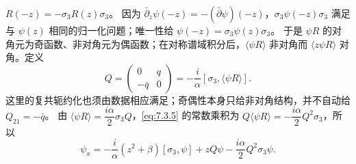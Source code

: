 \documentclass[lang=cn,scheme=chinese,mode=simple,device=normal,color=blue,math=cm,thmcnt=section,12pt]{elegantbook}
\newcommand{\eqq}[2]{\tag{#1}\label{eq:#1}#2}
\begin{document}
$R(-z)=-\sigma_3R(z)\sigma_3$。
因为 $\bar\partial_z\psi(-z)=-(\bar\partial\psi)(-z)$，$\sigma_3\psi(-z)\sigma_3$ 满足与 $\psi(z)$ 相同的归一化问题；唯一性给
$\psi(-z)=\sigma_3\psi(z)\sigma_3$。
于是 $\psi R$ 的对角元为奇函数、非对角元为偶函数；在对称谱域积分后，$\langle\psi R\rangle$ 非对角而 $\langle z\psi R\rangle$ 对角。定义
\begin{equation}
\eqq{7.3.6}{Q=\begin{pmatrix}0&q\\-\bar q&0\end{pmatrix}
=-\dfrac{i}{\alpha}[\sigma_3,\langle\psi R\rangle].}
\end{equation}
这里的复共轭约化也须由数据相应满足；奇偶性本身只给非对角结构，并不自动给 $Q_{21}=-\bar q$。
由 $\langle\psi R\rangle=\dfrac{i\alpha}{2}\sigma_3Q$，\eqref{eq:7.3.5} 的常数乘积为
$Q\langle\psi R\rangle=-\dfrac{i\alpha}{2}Q^2\sigma_3$，所以
\begin{equation}
\eqq{7.3.7}{\psi_x=-\dfrac{i}{\alpha}(z^2+\beta)[\sigma_3,\psi]+zQ\psi-\dfrac{i\alpha}{2}Q^2\sigma_3\psi.}
\end{equation}
\end{document}
